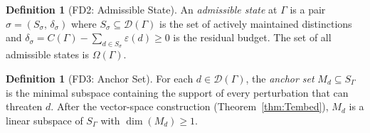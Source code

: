 \documentclass[11pt,a4paper]{article}
\theoremstyle{definition}
\newtheorem{definition}[theorem]{Definition}
\newcommand{\eps}{\varepsilon}
\begin{document}
\begin{definition}[FD2: Admissible State]
An \emph{admissible state} at $\Gamma$ is a pair $\sigma = (S_\sigma,\, \delta_\sigma)$ where $S_\sigma \subseteq \mathcal{D}(\Gamma)$ is the set of actively maintained distinctions and $\delta_\sigma = C(\Gamma) - \sum_{d \in S_\sigma} \eps(d) \ge 0$ is the residual budget.  The set of all admissible states is $\Omega(\Gamma)$.
\end{definition}

\begin{definition}[FD3: Anchor Set]
For each $d \in \mathcal{D}(\Gamma)$, the \emph{anchor set} $M_d \subseteq S_\Gamma$ is the minimal subspace containing the support of every perturbation that can threaten $d$.  After the vector-space construction (Theorem~\ref{thm:Tembed}), $M_d$ is a linear subspace of $S_\Gamma$ with $\dim(M_d) \ge 1$.
\end{definition}
\end{document}
